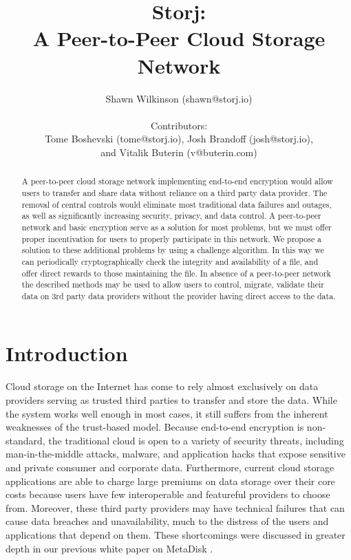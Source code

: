 \documentclass[a4paper,10pt]{article}
\begin{document}
\lstset{basicstyle=\ttfamily\footnotesize,breaklines=true}
\lstset{numbers=left, numberstyle=\tiny, stepnumber=1, numbersep=5pt}
\lstset{language=TeX}

\title{\textbf{Storj:\\A Peer-to-Peer Cloud Storage Network}}
\author{Shawn Wilkinson (shawn@storj.io)\\
\\Contributors:\\ 
Tome Boshevski (tome@storj.io), Josh Brandoff (josh@storj.io),\\ 
and Vitalik Buterin (v@buterin.com)}
\maketitle
\begin{abstract}
A peer-to-peer cloud storage network implementing end-to-end encryption would allow users to transfer and share data without reliance on a third party data provider. The removal of central controls would eliminate most traditional data failures and outages, as well as significantly increasing security, privacy, and data control. A peer-to-peer network and basic encryption serve as a solution for most problems, but we must offer proper incentivation for users to properly participate in this network. We propose a solution to these additional problems by using a challenge algorithm. In this way we can periodically cryptographically check the integrity and availability of a file, and offer direct rewards to those maintaining the file. In absence of a peer-to-peer network the described methods may be used to allow users to control, migrate, validate their data on 3rd party data providers without the provider having direct access to the data. 
\end{abstract}

\section{Introduction}
Cloud storage on the Internet has come to rely almost exclusively on data providers serving as trusted third parties to transfer and store the data. While the system works well enough in most cases, it still suffers from the inherent weaknesses of the trust-based model. Because end-to-end encryption is non-standard, the traditional cloud is open to a variety of security threats, including man-in-the-middle attacks, malware, and application hacks that expose sensitive and private consumer and corporate data. Furthermore, current cloud storage applications are able to charge large premiums on data storage over their core costs because users have few interoperable and featureful providers to choose from. Moreover, these third party providers may have technical failures that can cause data breaches and unavailability, much to the distress of the users and applications that depend on them. These shortcomings were discussed in greater depth in our previous white paper on MetaDisk \cite{1}.\\
\end{document}
